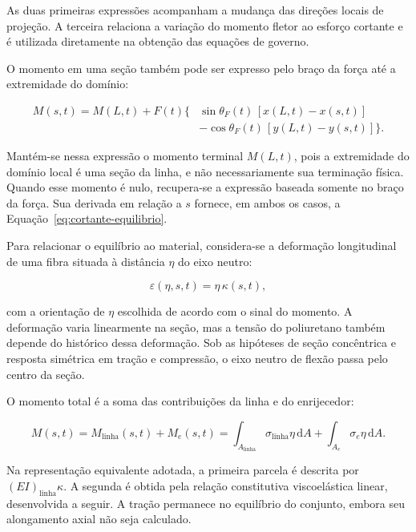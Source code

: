 \documentclass[arial,centeredequations,english,brazilian,oneside,section=TITLE]{ifes8}
\begin{document}
As duas primeiras expressões acompanham a mudança das direções locais de
projeção. A terceira relaciona a variação do momento fletor ao esforço cortante
e é utilizada diretamente na obtenção das equações de governo.

O momento em uma seção também pode ser expresso pelo braço da força até
a extremidade do domínio:

\begin{equation}
  \begin{aligned}
    M(s,t)=M(L,t)+F(t)\bigl\{&
      \sin\theta_F(t)\,[x(L,t)-x(s,t)]\\
      &-\cos\theta_F(t)\,[y(L,t)-y(s,t)]\bigr\}.
  \end{aligned}
  \label{eq:momento-braco-forca}
\end{equation}

Mantém-se nessa expressão o momento terminal $M(L,t)$, pois a extremidade do
domínio local é uma seção da linha, e não necessariamente sua terminação física.
Quando esse momento é nulo, recupera-se a expressão baseada somente no braço
da força. Sua derivada em relação a $s$ fornece, em ambos os casos,
a Equação~\eqref{eq:cortante-equilibrio}.

Para relacionar o equilíbrio ao material, considera-se a deformação longitudinal
de uma fibra situada à distância $\eta$ do eixo neutro:

\begin{equation}
  \varepsilon(\eta,s,t)=\eta\,\kappa(s,t),
  \label{eq:deformacao-fibra-metodologia}
\end{equation}

com a orientação de $\eta$ escolhida de acordo com o sinal do momento. A
deformação varia linearmente na seção, mas a tensão do poliuretano também
depende do histórico dessa deformação. Sob as hipóteses de seção concêntrica
e resposta simétrica em tração e compressão, o eixo neutro de flexão passa
pelo centro da seção.

O momento total é a soma das contribuições da linha e do enrijecedor:

\begin{equation}
  M(s,t)=M_{\mathrm{linha}}(s,t)+M_e(s,t)
  =\int_{A_{\mathrm{linha}}}\sigma_{\mathrm{linha}}\eta\,\mathrm{d}A
   +\int_{A_e}\sigma_e\eta\,\mathrm{d}A.
  \label{eq:momento-soma-componentes}
\end{equation}

Na representação equivalente adotada, a primeira parcela é descrita por
$(EI)_{\mathrm{linha}}\kappa$. A segunda é obtida pela relação constitutiva
viscoelástica linear, desenvolvida a seguir. A tração permanece no equilíbrio
do conjunto, embora seu alongamento axial não seja calculado.
\end{document}
